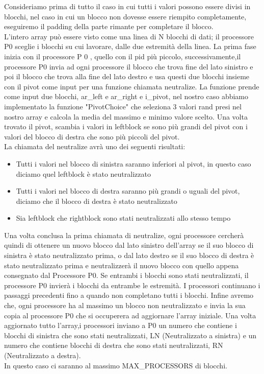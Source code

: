 Consideriamo prima di tutto il caso in cui tutti i valori possono essere divisi in blocchi, nel caso in cui un blocco non dovesse essere riempito completamente, eseguiremo il padding della parte rimante per completare il blocco. \\
L'intero array può essere visto come una linea di N blocchi di dati; il processore P0 sceglie i blocchi su cui lavorare, dalle due estremità della linea.
La prima fase inizia con il processore P 0 , quello con il pid più piccolo, successivamente,il processore P0 invia ad ogni processore il blocco che trova fine del lato sinistro e poi il blocco che trova alla fine del lato destro e usa questi due blocchi insieme con il pivot come input per una funzione chiamata neutralize. La funzione prende come input due blocchi, ar_left e ar_right e i_pivot, nel nostro caso abbiamo implementato la funzione "PivotChoice" che seleziona 3 valori rand presi nel nostro array e calcola la media del massimo e minimo valore scelto. Una volta trovato il pivot, scambia i valori in leftblock se sono più grandi del pivot con i valori del blocco di destra che sono più piccoli del pivot. \\
La chiamata del neutralize avrà uno dei seguenti risultati:

\begin{itemize}
\item Tutti i valori nel blocco di sinistra saranno inferiori al pivot, in questo caso diciamo quel leftblock è stato neutralizzato
\item Tutti i valori nel blocco di destra saranno più grandi o uguali
del pivot, diciamo che il blocco di destra è stato neutralizzato
\item Sia leftblock che rightblock sono stati neutralizzati allo stesso
tempo
\end{itemize}
 
Una volta conclusa la prima chiamata di neutralize, ogni processore cercherà quindi di ottenere un nuovo blocco dal lato sinistro dell'array se il suo blocco di sinistra è stato neutralizzato prima, o dal lato destro se il suo blocco di destra è stato neutralizzato prima e neutralizzerà il nuovo blocco con quello appena consegnato dal Processore P0. Se entrambi i blocchi sono stati neutralizzati, il processore P0 invierà i blocchi da entrambe le estremità. I processori continuano i passaggi precedenti fino a quando non completano tutti i blocchi. Infine avremo che, ogni processore ha al massimo un blocco non neutralizzato
e invia la sua copia al processore P0 che si occuperera ad aggiornare l'array iniziale.
Una volta aggiornato tutto l'array,i processori inviano a P0 un numero che contiene i blocchi di sinistra che sono stati neutralizzati, LN (Neutralizzato a sinistra) e un numero che contiene blocchi di destra che sono stati neutralizzati, RN (Neutralizzato a destra).\\
In questo caso ci saranno al massimo MAX_PROCESSORS di blocchi.

